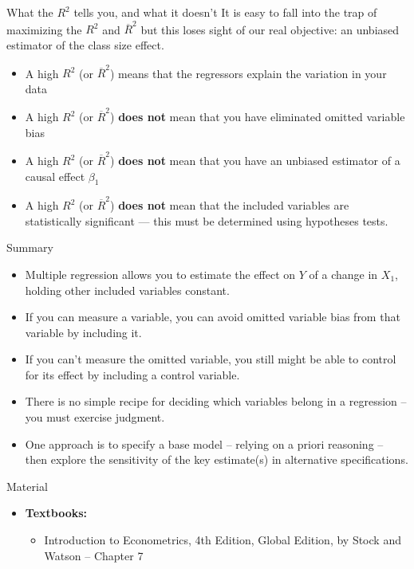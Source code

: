 \documentclass[notes,10pt, aspectratio=169]{beamer}
\begin{document}
\begin{frame}{What the $R^2$ tells you, and what it doesn't }
It is easy to fall into the trap of maximizing the $R^2$ and $\overline{R}^2$ but this loses sight of our real objective: an unbiased estimator of the class size effect.\\[1em]
\begin{itemize}
    \item A high $R^2$ (or $\overline{R}^2$) means that the regressors explain the variation in your data\\[1em]
    \item A high $R^2$ (or $\overline{R}^2$) \textbf{does not} mean that you have eliminated omitted variable bias
    \item A high $R^2$ (or $\overline{R}^2$) \textbf{does not} mean that you have an unbiased estimator of a causal effect $\beta_1$
    \item A high $R^2$ (or $\overline{R}^2$) \textbf{does not} mean that the included variables are statistically significant --- this must be determined using hypotheses tests.
\end{itemize}
\end{frame}

\begin{frame}{Summary}
\begin{itemize}
    \item Multiple regression allows you to estimate the effect on $Y$ of a change in $X_1$, holding other included variables constant.\\[1em]
    \item If you can measure a variable, you can avoid omitted variable bias from that variable by including it.\\[1em]
    \item If you can’t measure the omitted variable, you still might be able to control for its effect by including a control variable.\\[1em]
    \item There is no simple recipe for deciding which variables belong in a regression -- you must exercise judgment.\\[1em]
    \item One approach is to specify a base model -- relying on a priori reasoning -- then explore the sensitivity of the key estimate(s) in alternative specifications.
\end{itemize}

\end{frame}



\begin{frame}[allowframebreaks]{Material}
\begin{itemize}
    \item[--] \textbf{Textbooks:}
    \begin{itemize}
        \item Introduction to Econometrics, 4th Edition, Global Edition, by Stock and Watson -- Chapter 7
    \end{itemize}
\end{itemize}
\end{frame}
\end{document}
